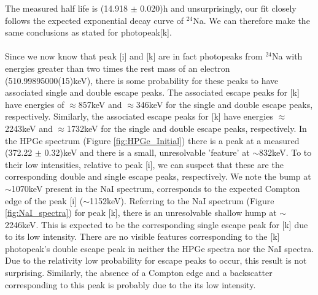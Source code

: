 \documentclass[]{article}
\begin{document}
The measured half life is (14.918 $\pm$ 0.020)h and unsurprisingly, our fit closely follows the expected exponential decay curve of ${}^{24}$Na. We can therefore make the same conclusions as stated for photopeak[k].\\\\
Since we now know that peak [i] and [k] are in fact photopeaks from ${}^{24}$Na with energies greater than two times the rest mass of an electron (510.99895000(15)keV), there is some probability for these peaks to have associated single and double escape peaks. The associated escape peaks for [k] have energies of $\approx$857keV and $\approx$346keV for the single and double escape peaks, respectively. Similarly, the associated escape peaks for [k] have energies $\approx$2243keV and $\approx$1732keV for the single and double escape peaks, respectively. In the HPGe spectrum (Figure \ref{fig:HPGe_Initial}) there is a peak at a measured (372.22 $\pm$ 0.32)keV and there is a small, unresolvable 'feature' at $\sim$832keV. To to their low intensities, relative to peak [i], we can suspect that these are the corresponding double and single escape peaks, respectively. We note the bump at $\sim$1070keV present in the NaI spectrum, corresponds to the expected Compton edge of the peak [i] ($\sim$1152keV). Referring to the NaI spectrum (Figure \ref{fig:NaI_spectra}) for peak [k], there is an unresolvable shallow hump at $\sim$2246keV. This is expected to be the corresponding single escape peak for [k] due to its low intensity. There are no visible features corresponding to the [k] photopeak's double escape peak in neither the HPGe spectra nor the NaI spectra. Due to the relativity low probability for escape peaks to occur, this result is not surprising. Similarly, the absence of a Compton edge and a backscatter corresponding to this peak is probably due to the its low intensity. \\\\
\end{document}
